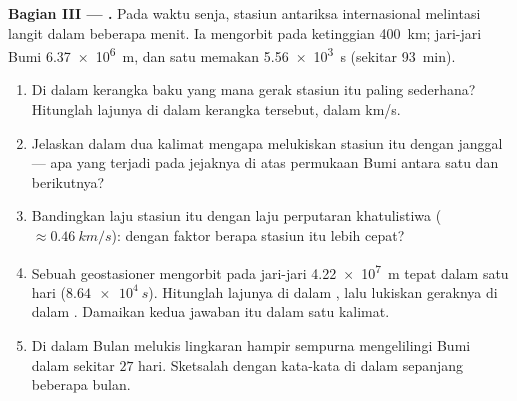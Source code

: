 \begin{problem}
\medskip
\noindent\textbf{Bagian III ---  .}
Pada waktu senja, stasiun antariksa internasional melintasi langit
dalam beberapa menit. Ia mengorbit pada ketinggian \qty{400}{km};
jari-jari Bumi \qty{6.37e6}{m}, dan satu  memakan \qty{5.56e3}{s}
(sekitar \qty{93}{min}).
\begin{enumerate}[resume]
  \item Di dalam kerangka baku yang mana gerak stasiun itu paling
        sederhana? Hitunglah lajunya di dalam kerangka tersebut, dalam
        \unit{km/s}.
  \item Jelaskan dalam dua kalimat mengapa  melukiskan
        stasiun itu dengan janggal --- apa yang terjadi pada jejaknya di
        atas permukaan Bumi antara satu  dan  berikutnya?
  \item Bandingkan laju  stasiun itu dengan laju perputaran
        khatulistiwa ($\approx \qty{0.46}{km/s}$): dengan faktor berapa
        stasiun itu lebih cepat?
  \item Sebuah  geostasioner mengorbit pada jari-jari
        \qty{4.22e7}{m} tepat dalam satu hari ($\qty{8.64e4}{s}$).
        Hitunglah lajunya di dalam , lalu lukiskan
        geraknya di dalam . Damaikan kedua jawaban itu
        dalam satu kalimat.
  \item Di dalam  Bulan melukis lingkaran hampir
        sempurna mengelilingi Bumi dalam sekitar $27$ hari. Sketsalah
        dengan kata-kata  di dalam 
        sepanjang beberapa bulan.
\end{enumerate}


\end{problem}
